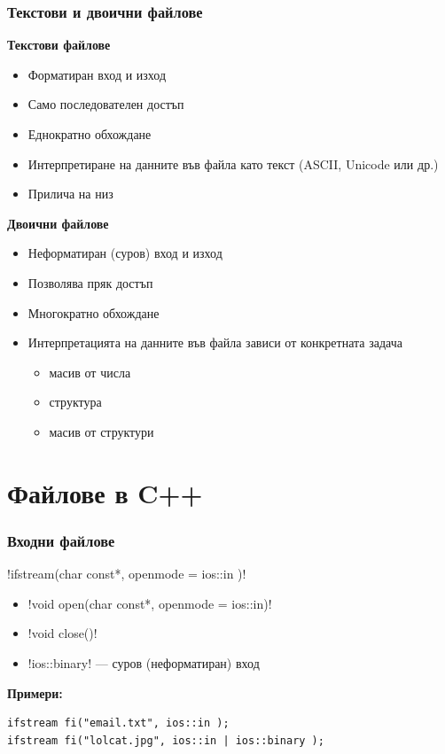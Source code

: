 \documentclass{beamer}
\begin{document}
\begin{frame}
  \frametitle{Текстови и двоични файлове}

  \textbf{Текстови файлове}
  \begin{itemize}[<+->]
  \item Форматиран вход и изход
  \item Само последователен достъп
  \item Еднократно обхождане
  \item Интерпретиране на данните във файла като текст (ASCII, Unicode или др.)
  \item Прилича на низ
  \end{itemize}

  \onslide<+->
  \textbf{Двоични файлове}
  \begin{itemize}[<+->]
  \item Неформатиран (суров) вход и изход
  \item Позволява пряк достъп
  \item Многократно обхождане
  \item Интерпретацията на данните във файла зависи от конкретната задача
    \begin{itemize}
    \item  масив от числа
    \item структура
    \item масив от структури
    \end{itemize}
  \end{itemize}
\end{frame}

\section{Файлове в C++}

\begin{frame}[fragile]
  \frametitle{Входни файлове}

  \lst!ifstream(char const*, openmode = ios::in )!\\[1em]
  \begin{itemize}
  \item \lst!void open(char const*, openmode = ios::in)!
  \item \lst!void close()!
  \item \lst!ios::binary! — суров (неформатиран) вход
  \end{itemize}
  \vspace{3em}
  \pause
  \textbf{Примери:}
\begin{lstlisting}
ifstream fi("email.txt", ios::in );
ifstream fi("lolcat.jpg", ios::in | ios::binary );
\end{lstlisting}
\end{frame}
\end{document}
